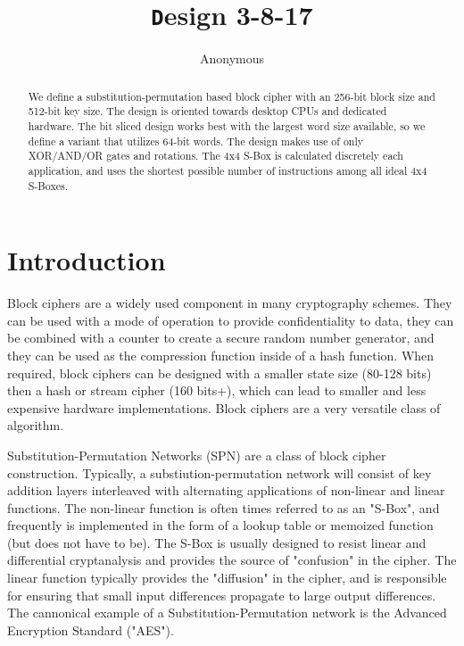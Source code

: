 \documentclass[preprint]{iacrtrans}
\author{Anonymous\inst{1}}
\institute{City, State \email{address@provider.com}}
\title[\texttt Design 3-8-17]{\texttt Design 3-8-17}
\begin{document}
\maketitle


\begin{abstract}
  We define a substitution-permutation based block cipher with an 256-bit block size and 512-bit key size. The design is oriented towards desktop CPUs and dedicated hardware. The bit sliced design works best with the largest word size available, so we define a variant that utilizes 64-bit words. The design makes use of only XOR/AND/OR gates and rotations. The 4x4 S-Box is calculated discretely each application, and uses the shortest possible number of instructions among all ideal 4x4 S-Boxes.\\ 
\end{abstract}

\todototoc
\listoftodos

\section{Introduction}
 Block ciphers are a widely used component in many cryptography schemes. They can be used with a mode of operation to provide confidentiality to data, they can be combined with a counter to create a secure random number generator, and they can be used as the compression function inside of a hash function. When required, block ciphers can be designed with a smaller state size (80-128 bits) then a hash or stream cipher (160 bits+), which can lead to smaller and less expensive hardware implementations. Block ciphers are a very versatile class of algorithm.

Substitution-Permutation Networks (SPN) are a class of block cipher construction. Typically, a substiution-permutation network will consist of key addition layers interleaved with alternating applications of non-linear and linear functions. The non-linear function is often times referred to as an "S-Box", and frequently is implemented in the form of a lookup table or memoized function (but does not have to be). The S-Box is usually designed to resist linear and differential cryptanalysis and provides the source of "confusion" in the cipher. The linear function typically provides the "diffusion" in the cipher, and is responsible for ensuring that small input differences propagate to large output differences. The cannonical example of a Substitution-Permutation network is the Advanced Encryption Standard ("AES").
\end{document}
